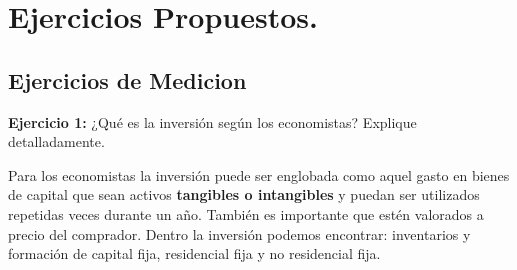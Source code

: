 \chapter{Ejercicios Propuestos.}

\section{Ejercicios de Medicion}


\textbf{Ejercicio 1:} ¿Qué es la inversión según los economistas? Explique detalladamente.

Para los economistas la inversión puede ser englobada como aquel gasto en bienes de capital que sean activos \textbf{tangibles o intangibles} y puedan ser utilizados repetidas veces durante un año. También es importante que estén valorados a precio del comprador. Dentro la inversión podemos encontrar: inventarios y formación de capital fija, residencial fija y no residencial fija.

